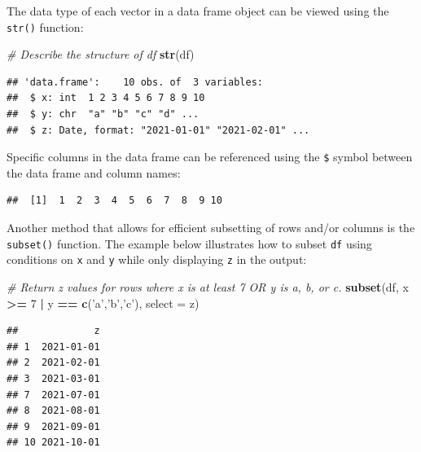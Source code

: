 \documentclass[]{book}
\newenvironment{Shaded}{\begin{snugshade}}{\end{snugshade}}
\newcommand{\CommentTok}[1]{\textcolor[rgb]{0.56,0.35,0.01}{\textit{#1}}}
\newcommand{\DataTypeTok}[1]{\textcolor[rgb]{0.13,0.29,0.53}{#1}}
\newcommand{\DecValTok}[1]{\textcolor[rgb]{0.00,0.00,0.81}{#1}}
\newcommand{\KeywordTok}[1]{\textcolor[rgb]{0.13,0.29,0.53}{\textbf{#1}}}
\newcommand{\NormalTok}[1]{#1}
\newcommand{\OperatorTok}[1]{\textcolor[rgb]{0.81,0.36,0.00}{\textbf{#1}}}
\newcommand{\StringTok}[1]{\textcolor[rgb]{0.31,0.60,0.02}{#1}}
\begin{document}
The data type of each vector in a data frame object can be viewed using the \texttt{str()} function:

\begin{Shaded}
\begin{Highlighting}[]
\CommentTok{# Describe the structure of df}
\KeywordTok{str}\NormalTok{(df)}
\end{Highlighting}
\end{Shaded}

\begin{verbatim}
## 'data.frame':    10 obs. of  3 variables:
##  $ x: int  1 2 3 4 5 6 7 8 9 10
##  $ y: chr  "a" "b" "c" "d" ...
##  $ z: Date, format: "2021-01-01" "2021-02-01" ...
\end{verbatim}

Specific columns in the data frame can be referenced using the \texttt{\$} symbol between the data frame and column names:

\begin{Shaded}
\end{Shaded}

\begin{verbatim}
##  [1]  1  2  3  4  5  6  7  8  9 10
\end{verbatim}

Another method that allows for efficient subsetting of rows and/or columns is the \texttt{subset()} function. The example below illustrates how to subset \texttt{df} using conditions on \texttt{x} and \texttt{y} while only displaying \texttt{z} in the output:

\begin{Shaded}
\begin{Highlighting}[]
\CommentTok{# Return z values for rows where x is at least 7 OR y is a, b, or c.}
\KeywordTok{subset}\NormalTok{(df, x }\OperatorTok{>=}\StringTok{ }\DecValTok{7} \OperatorTok{|}\StringTok{ }\NormalTok{y }\OperatorTok{==}\StringTok{ }\KeywordTok{c}\NormalTok{(}\StringTok{'a'}\NormalTok{,}\StringTok{'b'}\NormalTok{,}\StringTok{'c'}\NormalTok{), }\DataTypeTok{select =}\NormalTok{ z)}
\end{Highlighting}
\end{Shaded}

\begin{verbatim}
##             z
## 1  2021-01-01
## 2  2021-02-01
## 3  2021-03-01
## 7  2021-07-01
## 8  2021-08-01
## 9  2021-09-01
## 10 2021-10-01
\end{verbatim}
\end{document}
